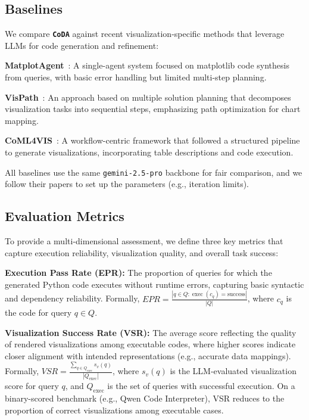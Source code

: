 \documentclass[11pt, a4paper, logo, copyright]{googlecloud}
\newcommand{\methodname}{\textbf{\texttt{\textcolor{StarIndigo}{C}\textcolor{StarIndigo}{o}\textcolor{StarCoral}{D}\textcolor{StarTeal}{A}}}}
\newcommand{\io}[1]{\setlength{\fboxsep}{1pt}\colorbox{gray!10}{\texttt{#1}}}
\begin{document}
\subsection{Baselines}
We compare \methodname{} against recent visualization-specific methods that leverage LLMs for code generation and refinement:

\textbf{MatplotAgent}~\citep{yang2024matplotagent}: A single-agent system focused on matplotlib code synthesis from queries, with basic error handling but limited multi-step planning.

\textbf{VisPath}~\citep{seo2025automated}: An approach based on multiple solution planning that decomposes visualization tasks into sequential steps, emphasizing path optimization for chart mapping.

\textbf{CoML4VIS}~\citep{chen2024viseval}: A workflow-centric framework that followed a structured pipeline to generate visualizations, incorporating table descriptions and code execution.


All baselines use the same \io{gemini-2.5-pro} backbone for fair comparison, and we follow their papers to set up the parameters (e.g., iteration limits).

\subsection{Evaluation Metrics}
To provide a multi-dimensional assessment, we define three key metrics that capture execution reliability, visualization quality, and overall task success:

\textbf{Execution Pass Rate (EPR):} The proportion of queries for which the generated Python code executes without runtime errors, capturing basic syntactic and dependency reliability. Formally, $EPR = \frac{|{q \in Q : \operatorname{exec}(c_q) = \text{success}}|}{|Q|}$, where $c_q$ is the code for query $q \in Q$. 

\textbf{Visualization Success Rate (VSR):} The average score reflecting the quality of rendered visualizations among executable codes, where higher scores indicate closer alignment with intended representations (e.g., accurate data mappings). Formally, $VSR = \frac{\sum_{q \in Q_{\text{exec}}} s_v(q)}{|Q_{\text{exec}}|}$, where $s_v(q)$ is the LLM-evaluated visualization score for query $q$, and $Q_{\text{exec}}$ is the set of queries with successful execution. On a binary-scored benchmark (e.g., Qwen Code Interpreter), VSR reduces to the proportion of correct visualizations among executable cases.
\end{document}
